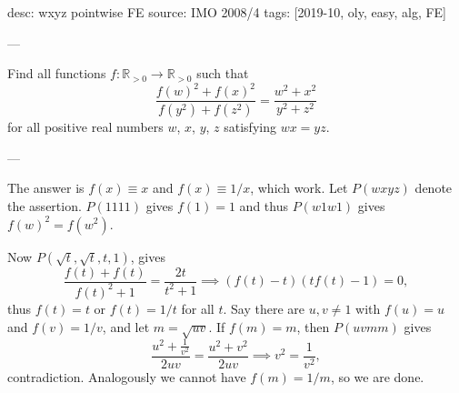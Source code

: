 desc: wxyz pointwise FE
source: IMO 2008/4
tags: [2019-10, oly, easy, alg, FE]

---

Find all functions $f:\mathbb R_{>0}\to\mathbb R_{>0}$ such that \[\frac{f(w)^2+f(x)^2}{f(y^2)+f(z^2)}=\frac{w^2+x^2}{y^2+z^2}\]
for all positive real numbers $w$, $x$, $y$, $z$ satisfying $wx=yz$.

---

The answer is $f(x)\equiv x$ and $f(x)\equiv1/x$, which work. Let $P(wxyz)$ denote the assertion. $P(1111)$ gives $f(1)=1$ and thus $P(w1w1)$ gives $f(w)^2=f(w^2)$.

Now $P(\sqrt t,\sqrt t,t,1)$, gives \[\frac{f(t)+f(t)}{f(t)^2+1}=\frac{2t}{t^2+1}\implies\left(f(t)-t\right)\left(tf(t)-1\right)=0,\]
thus $f(t)=t$ or $f(t)=1/t$ for all $t$. Say there are $u,v\ne1$ with $f(u)=u$ and $f(v)=1/v$, and let $m=\sqrt{uv}$. If $f(m)=m$, then $P(uvmm)$ gives \[\frac{u^2+\frac1{v^2}}{2uv}=\frac{u^2+v^2}{2uv}\implies v^2=\frac1{v^2},\]
contradiction. Analogously we cannot have $f(m)=1/m$, so we are done.
